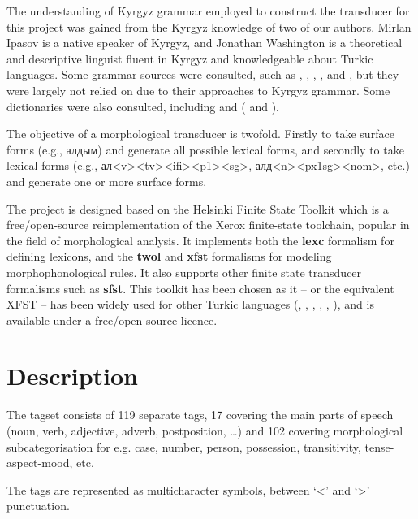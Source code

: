 \documentclass[a4paper,12pt,onecolumn,oneside]{article}
\newcommand{\citemultileft}[1]{(\citeauthor{#1}, \citeyear{#1}}
\newcommand{\citemultimid}[1]{\citeauthor{#1}, \citeyear{#1}}
\newcommand{\citemultiright}[1]{\citeauthor{#1}, \citeyear{#1})}
\newcommand{\citetwoyears}[2]{\citeauthor{#1} (\citeyear{#1} and \citeyear{#2})}
\begin{document}
The understanding of Kyrgyz grammar employed to construct the transducer for this project was gained from the Kyrgyz knowledge of two of our authors.  Mirlan Ipasov is a native speaker of Kyrgyz, and Jonathan Washington is a theoretical and descriptive linguist fluent in Kyrgyz and knowledgeable about Turkic languages.  Some grammar sources were consulted, such as \citet{hebertpoppe1963}, \citet{usonalievomuraliev2003}, \citet{qudaybergenov1980}, \citet{somfaikara2003}, and \citet{imart1981}, but they were largely not relied on due to their approaches to Kyrgyz grammar.  Some dictionaries were also consulted, including \citet{jumakunova2005} and \citetwoyears{yudakhin1957}{yudakhin1965}.

The objective of a morphological transducer is twofold. Firstly to take surface forms (e.g., алдым) and generate all possible lexical forms, and secondly to take lexical forms (e.g.,  ал<v><tv><ifi><p1><sg>, алд<n><px1sg><nom>, etc.) and generate one or more surface forms. 

The project is designed based on the Helsinki Finite State Toolkit \citep{linden2011} which is a free/open-source reimplementation of the Xerox finite-state toolchain, popular in the field of morphological analysis. It implements both the \textbf{lexc} formalism for defining lexicons, and the \textbf{twol} and \textbf{xfst} formalisms for modeling morphophonological rules. It also supports other finite state transducer formalisms such as \textbf{sfst}. This toolkit has been chosen as it -- or the equivalent XFST -- has been widely used for other Turkic languages \citemultileft{coltekin2010}, \citemultimid{altinasi2001}, \citemultiright{tantug2006}, and is available under a free/open-source licence.

\section{Description}
The tagset consists of 119 separate tags, 17 covering the main parts of speech (noun, verb, adjective, adverb, postposition, \ldots{}) and 102 covering morphological subcategorisation for e.g. case, number, person, possession, transitivity, tense-aspect-mood, etc.

The tags are represented as multicharacter symbols, between `<' and `>' punctuation.
\end{document}

